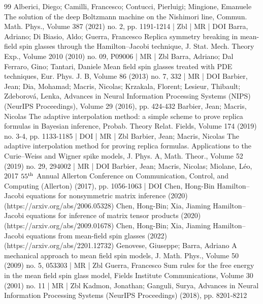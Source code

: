 \documentclass[10pt]{amsart}
\theoremstyle{definition}\newtheorem{defi}[theo]{Definition}\newtheorem{rema}[theo]{Remark}\newtheorem{exam}[theo]{Example}\newtheorem{exem}[theo]{Example}\newtheorem{nota}[theo]{Notation}
\begin{document}



\begin{thebibliography}{99}
Alberici, Diego; Camilli, Francesco; Contucci, Pierluigi; Mingione, Emanuele The solution of the deep Boltzmann machine on the Nishimori line, Commun. Math. Phys., Volume 387 (2021) no. 2, pp. 1191-1214 | Zbl | MR | DOI
Barra, Adriano; Di Biasio, Aldo; Guerra, Francesco Replica symmetry breaking in mean-field spin glasses through the Hamilton–Jacobi technique, J. Stat. Mech. Theory Exp., Volume 2010 (2010) no. 09, P09006 | MR | Zbl
Barra, Adriano; Dal Ferraro, Gino; Tantari, Daniele Mean field spin glasses treated with PDE techniques, Eur. Phys. J. B, Volume 86 (2013) no. 7, 332 | MR | DOI
Barbier, Jean; Dia, Mohamad; Macris, Nicolas; Krzakala, Florent; Lesieur, Thibault; Zdeborová, Lenka, Advances in Neural Information Processing Systems (NIPS) (NeurIPS Proceedings), Volume 29 (2016), pp. 424-432
Barbier, Jean; Macris, Nicolas The adaptive interpolation method: a simple scheme to prove replica formulas in Bayesian inference, Probab. Theory Relat. Fields, Volume 174 (2019) no. 3-4, pp. 1133-1185 | DOI | MR | Zbl
Barbier, Jean; Macris, Nicolas The adaptive interpolation method for proving replica formulas. Applications to the Curie–Weiss and Wigner spike models, J. Phys. A, Math. Theor., Volume 52 (2019) no. 29, 294002 | MR | DOI
Barbier, Jean; Macris, Nicolas; Miolane, Léo, 2017 $55^{\rm th}$ Annual Allerton Conference on Communication, Control, and Computing (Allerton) (2017), pp. 1056-1063 | DOI
Chen, Hong-Bin Hamilton–Jacobi equations for nonsymmetric matrix inference (2020) (https://arxiv.org/abs/2006.05328)
Chen, Hong-Bin; Xia, Jiaming Hamilton–Jacobi equations for inference of matrix tensor products (2020) (https://arxiv.org/abs/2009.01678)
Chen, Hong-Bin; Xia, Jiaming Hamilton–Jacobi equations from mean-field spin glasses (2022) (https://arxiv.org/abs/2201.12732)
Genovese, Giuseppe; Barra, Adriano A mechanical approach to mean field spin models, J. Math. Phys., Volume 50 (2009) no. 5, 053303 | MR | Zbl
Guerra, Francesco Sum rules for the free energy in the mean field spin glass model, Fields Institute Communications, Volume 30 (2001) no. 11 | MR | Zbl
Kadmon, Jonathan; Ganguli, Surya, Advances in Neural Information Processing Systems (NeurIPS Proceedings) (2018), pp. 8201-8212

\end{thebibliography}
\end{document}
